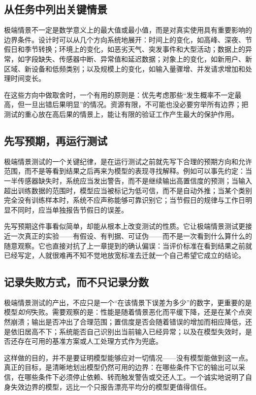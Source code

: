 \subsection{从任务中列出关键情景}

极端情景不一定是数学意义上的最大值或最小值，而是对真实使用具有重要影响的边界条件。设计时可以从几个方向系统地展开：时间上的变化，如高峰、深夜、节假日和季节转换；环境上的变化，如恶劣天气、突发事件和大型活动；数据上的异常，如字段缺失、传感器中断、异常值和延迟数据；对象上的变化，如新用户、新区域、新设备和低频类别；以及规模上的变化，如输入量骤增、并发请求增加和处理时间变长。

在这些方向中做取舍时，一个有用的原则是：优先考虑那些“发生概率不一定最高，但一旦出错后果明显”的情况。资源有限，不可能也没必要穷举所有边界；把测试的重心放在高后果的情景上，能让有限的验证工作产生最大的保护作用。

\subsection{先写预期，再运行测试}

极端情景测试的一个关键纪律，是在运行测试之前就先写下合理的预期方向和允许范围，而不是等看到结果之后再来为模型的表现寻找解释。例如可以事先约定：当一半传感器缺失时，系统应当发出警告，而不是继续输出高置信度的预测；当输入超出训练数据的范围时，模型应当被标记为低可信，而不是自动外推；当某个类别完全没有训练样本时，系统不应声称能够可靠识别它；当节假日的规律与工作日明显不同时，应当单独报告节假日的误差。

先写预期这件事看似简单，却能从根本上改变测试的性质。它让极端情景测试更接近一次真正的实验——有假设、有判据、可证伪——而不是一次看到什么算什么的随意观察。它也直接对抗了上一章提到的确认偏误：当评价标准在看到结果之前就已经写定，人就很难再不知不觉地放宽标准去迁就一个自己希望它成立的结论。

\subsection{记录失败方式，而不只记录分数}

极端情景测试的产出，不应只是一个“在该情景下误差为多少”的数字，更重要的是模型\emph{如何}失败。需要观察的是：性能是随着情景恶化而平缓下降，还是在某个点突然崩溃；输出是否冲出了合理范围；置信度是否会随着错误的增加而相应降低，还是依旧居高不下；系统能否自己识别出当前输入已经异常；以及在模型失效时，是否还存在可用的基准方案或人工处理方式作为兜底。

这样做的目的，并不是要证明模型能够应对一切情况——没有模型能做到这一点。真正的目标，是清晰地划出模型仍然可用的边界：在哪些条件下它的输出可以采信，在哪些条件下必须停止依赖、转而触发警告或交还人工。一个诚实地说明了自身失效边界的模型，远比一个只报告漂亮平均分的模型更值得信任。

